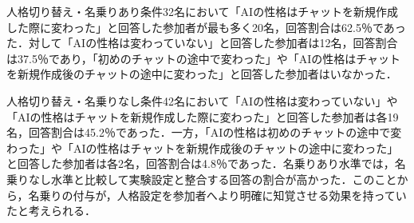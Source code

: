 \documentclass[10pt,twocolumn]{jsarticle}
\begin{document}
人格切り替え・名乗りあり条件32名において「AIの性格はチャットを新規作成した際に変わった」と回答した参加者が最も多く20名，回答割合は62.5％であった．対して「AIの性格は変わっていない」と回答した参加者は12名，回答割合は37.5％であり，「初めのチャットの途中で変わった」や「AIの性格はチャットを新規作成後のチャットの途中に変わった」と回答した参加者はいなかった．

人格切り替え・名乗りなし条件42名において「AIの性格は変わっていない」や「AIの性格はチャットを新規作成した際に変わった」と回答した参加者は各19名，回答割合は45.2％であった．一方，「AIの性格は初めのチャットの途中で変わった」や「AIの性格はチャットを新規作成後のチャットの途中に変わった」と回答した参加者は各2名，回答割合は4.8％であった．名乗りあり水準では，名乗りなし水準と比較して実験設定と整合する回答の割合が高かった．このことから，名乗りの付与が，人格設定を参加者へより明確に知覚させる効果を持っていたと考えられる．
\end{document}
